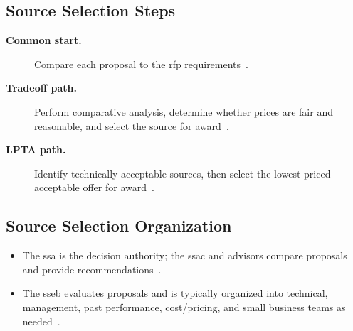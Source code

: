 \documentclass[../main.tex]{subfiles}
\begin{document}
\subsection{Source Selection Steps}
\begin{description}
  \item[\textbf{Common start.}] Compare each proposal to the \ac{rfp} requirements~\autocite{edo-3-2-3-source-selection-2025,FAR-15-305-Proposal-Evaluation}.
  \item[\textbf{Tradeoff path.}] Perform comparative analysis, determine whether prices are fair and reasonable, and select the source for award~\autocite{edo-3-2-3-source-selection-2025,FAR-15-101-1-Tradeoff,FAR-15-305-Proposal-Evaluation,FAR-15-308-Source-Selection-Decision}.
  \item[\textbf{LPTA path.}] Identify technically acceptable sources, then select the lowest-priced acceptable offer for award~\autocite{edo-3-2-3-source-selection-2025,FAR-15-101-2-LPTA,FAR-15-305-Proposal-Evaluation}.
\end{description}

\subsection{Source Selection Organization}
\begin{itemize}
  \item The \ac{ssa} is the decision authority; the \ac{ssac} and advisors compare proposals and provide recommendations~\autocite{edo-3-2-3-source-selection-2025,DoD-Source-Selection-Procedures-2022,FAR-15-303-Responsibilities,FAR-15-308-Source-Selection-Decision}.
  \item The \ac{sseb} evaluates proposals and is typically organized into technical, management, past performance, cost/pricing, and small business teams as needed~\autocite{edo-3-2-3-source-selection-2025,DoD-Source-Selection-Procedures-2022,FAR-15-305-Proposal-Evaluation}.
\end{itemize}
\end{document}

